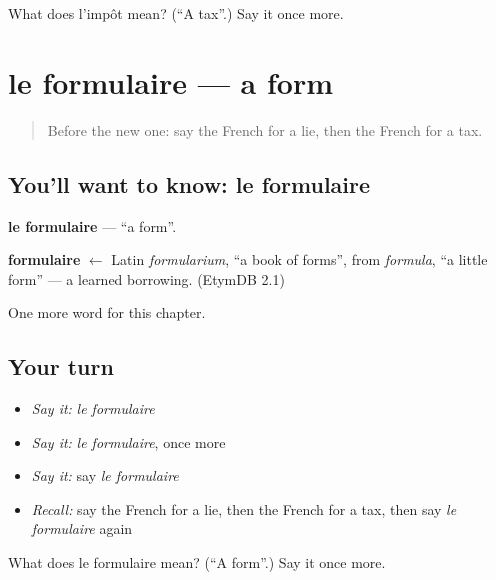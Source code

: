 \begin{tcolorbox}[breakable,colback=teal!4,colframe=teal!35!black,title={Before you move on}]
What does l'impôt mean? (\textquotedblleft{}A tax\textquotedblright{}.) Say it once more.
\end{tcolorbox}
\section[le formulaire]{le formulaire — a form}

\label{lesson:FR-C252-formulaire}



\begin{quote}
Before the new one: say the French for a lie, then the French for a tax.
\end{quote}

\subsection*{You'll want to know: le formulaire}
\textbf{le formulaire} — \textquotedblleft{}a form\textquotedblright{}.

\begin{cousinweb}
\textbf{formulaire} $\leftarrow$ Latin \emph{formularium}, \textquotedblleft{}a book of forms\textquotedblright{}, from \emph{formula}, \textquotedblleft{}a little form\textquotedblright{} — a learned borrowing. (EtymDB 2.1)
\end{cousinweb}

\begin{grammarlens}[title={What you've built}]
One more word for this chapter.
\end{grammarlens}

\subsection*{Your turn}
\begin{itemize}
\raggedright
  \item \emph{Say it:} \emph{le formulaire}
  \item \emph{Say it:} \emph{le formulaire}, once more
  \item \emph{Say it:} say \emph{le formulaire}
  \item \emph{Recall:} say the French for a lie, then the French for a tax, then say \emph{le formulaire} again
\end{itemize}

\begin{tcolorbox}[breakable,colback=teal!4,colframe=teal!35!black,title={Before you move on}]
What does le formulaire mean? (\textquotedblleft{}A form\textquotedblright{}.) Say it once more.
\end{tcolorbox}
